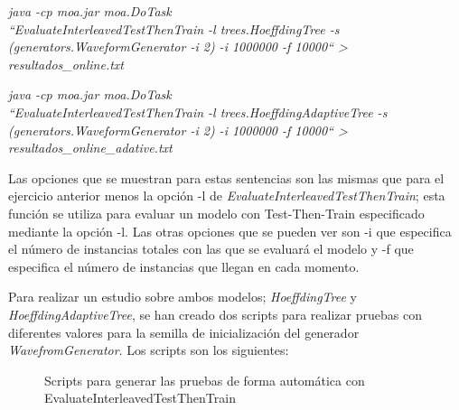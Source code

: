 \textit{java -cp moa.jar moa.DoTask \\
``EvaluateInterleavedTestThenTrain -l
trees.HoeffdingTree -s
(generators.WaveformGenerator -i 2)
-i 1000000 -f 10000`` > resultados\_online.txt}

\textit{java -cp moa.jar moa.DoTask \\
``EvaluateInterleavedTestThenTrain -l
trees.HoeffdingAdaptiveTree -s
(generators.WaveformGenerator -i 2)
-i 1000000 -f 10000`` > resultados\_online\_adative.txt}

Las opciones que se muestran para estas sentencias son las mismas que para el ejercicio anterior menos la opción -l de \textit{EvaluateInterleavedTestThenTrain}; esta función se utiliza  para evaluar un modelo con Test-Then-Train especificado mediante la opción -l. Las otras opciones que se pueden ver son -i que especifica el número de instancias totales con las que se evaluará el modelo y -f que especifica el número de instancias que llegan en cada momento.

Para realizar un estudio sobre ambos modelos; \textit{HoeffdingTree} y \textit{HoeffdingAdaptiveTree}, se han creado dos scripts para realizar pruebas con diferentes valores para la semilla de inicialización del generador \textit{WavefromGenerator}. Los scripts son los siguientes:

\begin{figure}[H]
	\centering
	\caption{Scripts para generar las pruebas de forma automática con EvaluateInterleavedTestThenTrain}
	\label{fig:scripts2}
\end{figure}

